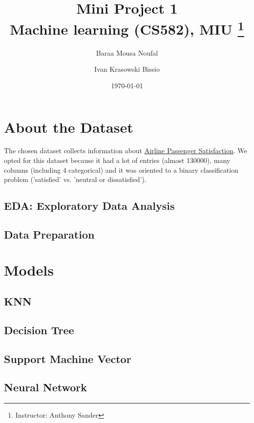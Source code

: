 \documentclass[titlepage, 11pt]{article}
\title{
	\textbf{Mini Project 1} \\
	Machine learning (CS582), MIU \thanks{Instructor: Anthony Sander}
}
\author{Baraa Mousa Noufal \and Ivan Krasowski Bissio}
\date{\today}
\begin{document}
\maketitle
\tableofcontents

\begin{abstract}
	
\end{abstract}

\section{About the Dataset}
The chosen dataset collects information about \href{https://www.kaggle.com/binaryjoker/airline-passenger-satisfaction/download}{Airline Passenger Satisfaction}.
We opted for this dataset because it had a lot of entries (almost 130000), many columns (including 4 categorical) and it was oriented to a binary classification problem ('satisfied' vs. 'neutral or dissatisfied').

\subsection{EDA: Exploratory Data Analysis}


\subsection{Data Preparation}


\section{Models}
\subsection{KNN}


\subsection{Decision Tree}


\subsection{Support Machine Vector}


\subsection{Neural Network}

\end{document}
